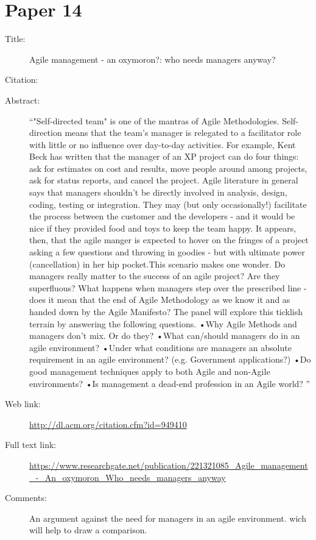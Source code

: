 \documentclass{scrartcl}
\begin{document}
\section*{Paper 14}
\begin{description}
	\item[Title:] Agile management - an oxymoron?: who needs managers anyway?
	\item[Citation:] \cite{Oxymoron}
	\item[Abstract:] ``"Self-directed team" is one of the mantras of Agile Methodologies. Self-direction means that the team's manager is relegated to a facilitator role with little or no influence over day-to-day activities. For example, Kent Beck has written that the manager of an XP project can do four things: ask for estimates on cost and results, move people around among projects, ask for status reports, and cancel the project. Agile literature in general says that managers shouldn't be directly involved in analysis, design, coding, testing or integration. They may (but only occasionally!) facilitate the process between the customer and the developers - and it would be nice if they provided food and toys to keep the team happy. It appears, then, that the agile manger is expected to hover on the fringes of a project asking a few questions and throwing in goodies - but with ultimate power (cancellation) in her hip pocket.This scenario makes one wonder. Do managers really matter to the success of an agile project? Are they superfluous? What happens when managers step over the prescribed line - does it mean that the end of Agile Methodology as we know it and as handed down by the Agile Manifesto? The panel will explore this ticklish terrain by answering the following questions.
	•Why Agile Methods and managers don't mix. Or do they?
	•What can/should managers do in an agile environment?
	•Under what conditions are managers an absolute requirement in an agile environment? (e.g. Government applications?)
	•Do good management techniques apply to both Agile and non-Agile environments?
	•Is management a dead-end profession in an Agile world?
	''
	\item[Web link:] \url{http://dl.acm.org/citation.cfm?id=949410}
	\item[Full text link:] \url{https://www.researchgate.net/publication/221321085_Agile_management_-_An_oxymoron_Who_needs_managers_anyway}
	\item[Comments:] An argument against the need for managers in an agile environment. wich will help to draw a comparison.
\end{description}



\end{document}
